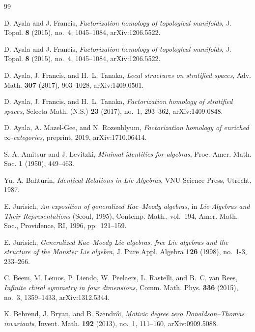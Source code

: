 \begin{thebibliography}{99}

D. Ayala and J. Francis, \emph{Factorization homology of topological manifolds}, J. Topol. \textbf{8} (2015), no.~4, 1045--1084, arXiv:1206.5522.

D. Ayala and J. Francis, \emph{Factorization homology of topological manifolds}, J. Topol. \textbf{8} (2015), no.~4, 1045--1084, arXiv:1206.5522. %

D. Ayala, J. Francis, and H.~L. Tanaka, \emph{Local structures on stratified spaces}, Adv. Math. \textbf{307} (2017), 903--1028, arXiv:1409.0501.

D. Ayala, J. Francis, and H.~L. Tanaka, \emph{Factorization homology of stratified spaces}, Selecta Math. (N.S.) \textbf{23} (2017), no.~1, 293--362, arXiv:1409.0848.

D. Ayala, A. Mazel-Gee, and N. Rozenblyum, \emph{Factorization homology of enriched $\infty$-categories}, preprint, 2019, arXiv:1710.06414.

S. A. Amitsur and J. Levitzki, \emph{Minimal identities for algebras}, Proc. Amer. Math. Soc. \textbf{1} (1950), 449--463.

Yu. A. Bahturin, \emph{Identical Relations in Lie Algebras}, VNU Science Press, Utrecht, 1987.

E. Jurisich, \emph{An exposition of generalized Kac--Moody algebras}, in \emph{Lie Algebras and Their Representations} (Seoul, 1995), Contemp. Math., vol.~194, Amer. Math. Soc., Providence, RI, 1996, pp.~121--159.

E. Jurisich, \emph{Generalized Kac--Moody Lie algebras, free Lie algebras and the structure of the Monster Lie algebra}, J. Pure Appl. Algebra \textbf{126} (1998), no.~1-3, 233--266.

C. Beem, M. Lemos, P. Liendo, W. Peelaers, L. Rastelli, and B.~C. van Rees, \emph{Infinite chiral symmetry in four dimensions}, Comm. Math. Phys. \textbf{336} (2015), no.~3, 1359--1433, arXiv:1312.5344.

K. Behrend, J. Bryan, and B. Szendr\H{o}i, \emph{Motivic degree zero Donaldson--Thomas invariants}, Invent. Math. \textbf{192} (2013), no.~1, 111--160, arXiv:0909.5088.


\end{thebibliography}
